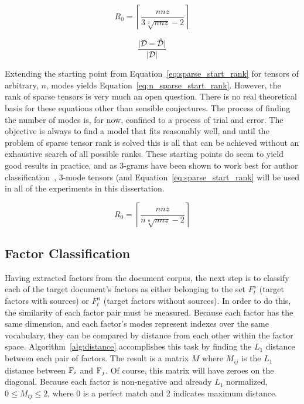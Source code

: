 \documentclass[../ut-dissertation.tex]{subfiles}
\begin{document}
\begin{equation}\label{eq:sparse_start_rank}
  R_0 = \left\lceil \displaystyle\frac{nnz}{3\sqrt[3]{nnz}-2} \right\rceil
\end{equation}
  
\begin{equation}\label{eq:error_ratio}
  \displaystyle\frac{|\mathcal{D} - \mathcal{\hat{D}}|}{|\mathcal{D}|}
\end{equation}

Extending the starting point from Equation~\ref{eq:sparse_start_rank}
for tensors of arbitrary, $n$, modes yields
Equation~\ref{eq:n_sparse_start_rank}.  However, the rank of sparse
tensors is very much an open question.  There is no real theoretical
basis for these equations other than sensible conjectures.  The
process of finding the number of modes is, for now, confined to a
process of trial and error.  The objective is always to find a model
that fits reasonably well, and until the problem of sparse tensor rank
is solved this is all that can be achieved without an exhaustive
search of all possible ranks. These starting points do seem to yield
good results in practice, and as 3-grams have been shown to work best
for author classification~\cite{antonia2014}, 3-mode tensors (and
Equation~\ref{eq:sparse_start_rank} will be used in all of the
experiments in this dissertation.

\begin{equation}\label{eq:n_sparse_start_rank}
  R_0 = \left\lceil \displaystyle\frac{nnz}{n\sqrt[n]{nnz}-2} \right\rceil
\end{equation}


\subsection{Factor Classification}
Having extracted factors from the document corpus, the next step is to
classify each of the target document's factors as either belonging to
the set $F^s_t$ (target factors with sources) or $F^n_t$ (target
factors without sources).  In order to do this, the similarity of each
factor pair must be measured.  Because each factor has the same
dimension, and each factor's modes represent indexes over the same
vocabulary, they can be compared by distance from each other within
the factor space.  Algorithm~\ref{alg:distance} accomplishes this task
by finding the $L_1$ distance between each pair of factors.  The
result is a matrix $M$ where $M_{ij}$ is the $L_1$ distance between
$\mathrm{F}_i$ and $\mathrm{F}_j$.  Of course, this matrix will have zeroes
on the diagonal.  Because each factor is non-negative and already
$L_1$ normalized, $0 \leq M_{ij} \leq 2$, where 0 is a perfect match
and 2 indicates maximum distance.
\end{document}
